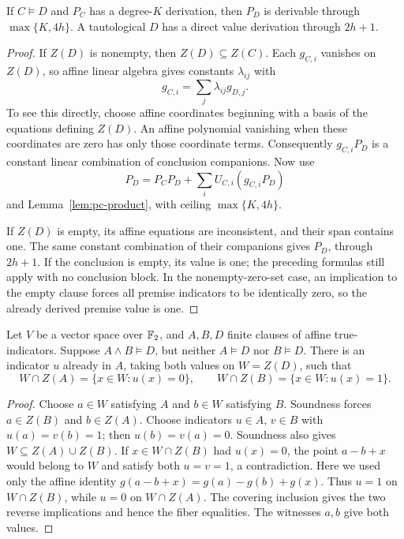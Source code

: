 \begin{lemma}\label{lem:clause-weakening}
If \(C\models D\) and \(P_C\) has a degree-\(K\) derivation, then
\(P_D\) is derivable through \(\max\{K,4h\}\).
A tautological \(D\) has a direct value derivation through \(2h+1\).
\end{lemma}
\begin{proof}
If \(Z(D)\) is nonempty, then \(Z(D)\subseteq Z(C)\).
Each \(g_{C,i}\) vanishes on \(Z(D)\), so affine linear algebra gives
constants \(\lambda_{ij}\) with
\[
 g_{C,i}=\sum_j\lambda_{ij}g_{D,j}.
\]
To see this directly, choose affine coordinates beginning with a basis
of the equations defining \(Z(D)\). An affine polynomial vanishing when
these coordinates are zero has only those coordinate terms.
Consequently \(g_{C,i}P_D\) is a constant linear combination of
conclusion companions. Now use
\[
 P_D=P_CP_D+\sum_iU_{C,i}(g_{C,i}P_D)
\]
and Lemma~\ref{lem:pc-product}, with ceiling \(\max\{K,4h\}\).

If \(Z(D)\) is empty, its affine equations are inconsistent, and their
span contains one. The same constant combination of their companions
gives \(P_D\), through \(2h+1\).
If the conclusion is empty, its value is one; the preceding formulas
still apply with no conclusion block. In the nonempty-zero-set case,
an implication to the empty clause forces all premise indicators to
be identically zero, so the already derived premise value is one.
\end{proof}


\begin{lemma}\label{lem:binary-separator}
Let \(V\) be a vector space over \(\mathbb F_2\), and \(A,B,D\) finite clauses
of affine true-indicators. Suppose \(A\wedge B\models D\), but neither
\(A\models D\) nor \(B\models D\). There is an indicator \(u\) already
in \(A\), taking both values on \(W=Z(D)\), such that
\[
 W\cap Z(A)=\{x\in W:u(x)=0\},\qquad
 W\cap Z(B)=\{x\in W:u(x)=1\}.
\]
\end{lemma}
\begin{proof}
Choose \(a\in W\) satisfying \(A\) and \(b\in W\) satisfying \(B\).
Soundness forces \(a\in Z(B)\) and \(b\in Z(A)\). Choose indicators
\(u\in A\), \(v\in B\) with \(u(a)=v(b)=1\); then
\(u(b)=v(a)=0\). Soundness also gives \(W\subseteq Z(A)\cup Z(B)\).
If \(x\in W\cap Z(B)\) had \(u(x)=0\), the point \(a-b+x\) would
belong to \(W\) and satisfy both \(u=v=1\), a contradiction. Here we
used only the affine identity \(g(a-b+x)=g(a)-g(b)+g(x)\).
Thus \(u=1\) on \(W\cap Z(B)\), while \(u=0\) on \(W\cap Z(A)\).
The covering inclusion gives the two reverse implications and hence the
fiber equalities. The witnesses \(a,b\) give both values.
\end{proof}

